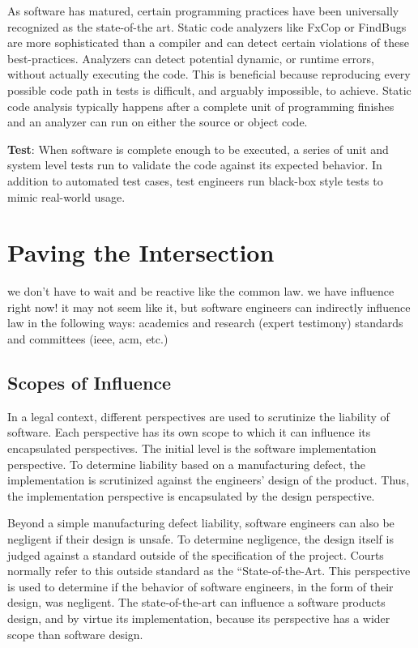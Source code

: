 \documentclass[12pt]{report}
\begin{document}
As software has matured, certain programming practices have been universally recognized as the state-of-the art. Static code analyzers like FxCop or FindBugs are more sophisticated than a compiler and can detect certain violations of these best-practices. Analyzers can detect potential dynamic, or runtime errors, without actually executing the code. This is beneficial because reproducing every possible code path in tests is difficult, and arguably impossible, to achieve. Static code analysis typically happens after a complete unit of programming finishes and an analyzer can run on either the source or object code. 

\textbf{Test}: When software is complete enough to be executed, a series of unit and system level tests run to validate the code against its expected behavior. In  addition to automated test cases, test engineers run black-box style tests to mimic real-world usage. 

\chapter{Paving the Intersection} 
we don't have to wait and be reactive like the common law. we have influence right now! it may not seem like it, but software engineers can indirectly influence law in the following ways: 
academics and research (expert testimony) 
standards and committees (ieee, acm, etc.) 

\section{Scopes of Influence} 

In a legal context, different perspectives are used to scrutinize the liability of software. Each perspective has its own scope to which it can influence its encapsulated perspectives. The initial level is the software implementation perspective. To determine liability based on a manufacturing defect, the implementation is scrutinized against the engineers' design of the product. Thus, the implementation perspective is encapsulated by the design perspective. 

Beyond a simple manufacturing defect liability, software engineers can also be negligent if their design is unsafe. To determine negligence, the design itself is judged against a standard outside of the specification of the project. Courts normally refer to this outside standard as the ``State-of-the-Art. This perspective is used to determine if the behavior of software engineers, in the form of their design, was negligent. The state-of-the-art can influence a software products design, and by virtue its implementation, because its perspective has a wider scope than software design. 
\end{document}
